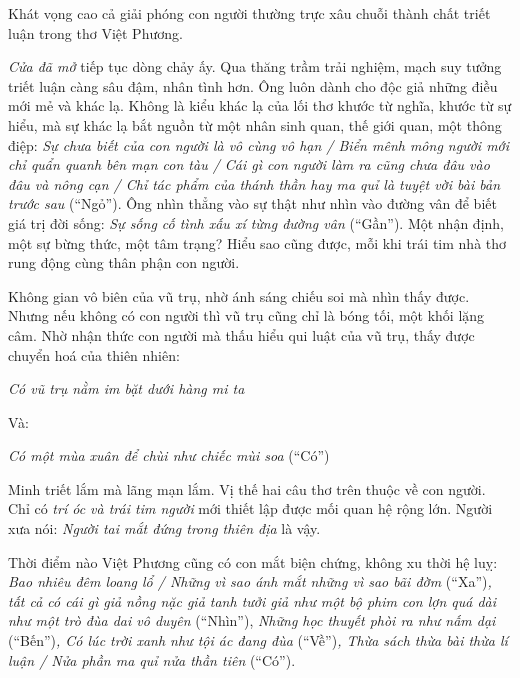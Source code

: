 \documentclass[../main.tex]{subfiles}
\begin{document}
\begin{multicols}{2}
\begin{blockquote}
\end{blockquote}
 
Khát vọng cao cả giải phóng con người thường trực xâu chuỗi thành chất triết luận trong thơ Việt Phương. 
 
\textit{Cửa đã mở}  tiếp tục dòng chảy ấy. Qua thăng trầm trải nghiệm, mạch suy tưởng triết luận càng sâu đậm, nhân tình hơn. Ông luôn dành cho độc giả những điều mới mẻ và khác lạ. Không là kiểu khác lạ của lối thơ khước từ nghĩa, khước từ sự hiểu, mà sự khác lạ bắt nguồn từ một nhân sinh quan, thế giới quan, một thông điệp: \textit{Sự chưa biết của con người là vô cùng vô hạn / Biển mênh mông người mới chỉ quẩn quanh bên mạn con tàu / Cái gì con người làm ra cũng chưa đâu vào đâu và nông cạn / Chỉ tác phẩm của thánh thần hay ma quỉ là tuyệt vời bài bản trước sau }(“Ngỏ”). Ông nhìn thẳng vào sự thật như nhìn vào đường vân để biết giá trị đời sống: \textit{Sự sống cố tình xấu xí từng đường vân }(“Gần”). Một nhận định, một sự bừng thức, một tâm trạng? Hiểu sao cũng được, mỗi khi trái tim nhà thơ rung động cùng thân phận con người. 
 
Không gian vô biên của vũ trụ, nhờ ánh sáng chiếu soi mà nhìn thấy được. Nhưng nếu không có con người thì vũ trụ cũng chỉ là bóng tối, một khối lặng câm. Nhờ nhận thức con người mà thấu hiểu qui luật của vũ trụ, thấy được chuyển hoá của thiên nhiên: 
\begin{blockquote}
 
\textit{Có vũ trụ nằm im bặt dưới hàng mi ta} 
\textit{     }
\end{blockquote}

\textit{      } 
 Và: 
   \begin{blockquote}
                                
\textit{Có một mùa xuân để chùi như chiếc mùi soa}        
(“Có”) 
  \end{blockquote}
           
Minh triết lắm mà lãng mạn lắm. Vị thế hai câu thơ trên thuộc về con người. Chỉ có \textit{trí óc và trái tim người} mới thiết lập được mối quan hệ rộng lớn. Người xưa nói: \textit{Người tai mắt đứng trong thiên địa} là vậy. 
 
Thời điểm nào Việt Phương cũng có con mắt biện chứng, không xu thời hệ luỵ: \textit{Bao nhiêu đêm loang lổ / Những vì sao ánh mắt những vì sao bãi đờm }(“Xa”)\textit{, tất cả có cái gì giả nồng nặc giả tanh tưởi giả như một bộ phim con lợn quá dài như một trò đùa dai vô duyên }(“Nhìn”), \textit{Những học thuyết phòi ra như nấm dại }(“Bến”)\textit{, Có lúc trời xanh như tội ác đang đùa }(“Về”)\textit{, Thừa sách thừa bài thừa lí luận / Nửa phần ma quỉ nửa thần tiên} (“Có”). 
              

\end{multicols}
\end{document}
